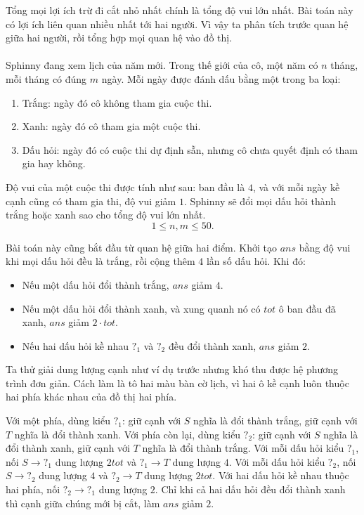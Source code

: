 \documentclass[11pt]{article}
\begin{document}
Tổng mọi lợi ích trừ đi cắt nhỏ nhất chính là tổng độ vui lớn nhất. Bài toán
này có lợi ích liên quan nhiều nhất tới hai người. Vì vậy ta phân tích trước
quan hệ giữa hai người, rồi tổng hợp mọi quan hệ vào đồ thị.

\paragraph{}
Sphinny đang xem lịch của năm mới. Trong thế giới của cô, một năm có \(n\)
tháng, mỗi tháng có đúng \(m\) ngày. Mỗi ngày được đánh dấu bằng một trong ba
loại:
\begin{enumerate}
  \item Trắng: ngày đó cô không tham gia cuộc thi.
  \item Xanh: ngày đó cô tham gia một cuộc thi.
  \item Dấu hỏi: ngày đó có cuộc thi dự định sẵn, nhưng cô chưa quyết định có
  tham gia hay không.
\end{enumerate}

Độ vui của một cuộc thi được tính như sau: ban đầu là \(4\), và với mỗi ngày
kề cạnh cũng có tham gia thi, độ vui giảm \(1\). Sphinny sẽ đổi mọi dấu hỏi
thành trắng hoặc xanh sao cho tổng độ vui lớn nhất.
\[
  1\le n,m\le 50.
\]

Bài toán này cũng bắt đầu từ quan hệ giữa hai điểm. Khởi tạo \(ans\) bằng độ
vui khi mọi dấu hỏi đều là trắng, rồi cộng thêm \(4\) lần số dấu hỏi. Khi đó:
\begin{itemize}
  \item Nếu một dấu hỏi đổi thành trắng, \(ans\) giảm \(4\).
  \item Nếu một dấu hỏi đổi thành xanh, và xung quanh nó có \(tot\) ô ban đầu
  đã xanh, \(ans\) giảm \(2\cdot tot\).
  \item Nếu hai dấu hỏi kề nhau \(?_{1}\) và \(?_{2}\) đều đổi thành xanh,
  \(ans\) giảm \(2\).
\end{itemize}

Ta thử giải dung lượng cạnh như ví dụ trước nhưng khó thu được hệ phương
trình đơn giản. Cách làm là tô hai màu bàn cờ lịch, vì hai ô kề cạnh luôn
thuộc hai phía khác nhau của đồ thị hai phía.

Với một phía, dùng kiểu \(?_{1}\): giữ cạnh với \(S\) nghĩa là đổi thành trắng,
giữ cạnh với \(T\) nghĩa là đổi thành xanh. Với phía còn lại, dùng kiểu
\(?_{2}\): giữ cạnh với \(S\) nghĩa là đổi thành xanh, giữ cạnh với \(T\)
nghĩa là đổi thành trắng. Với mỗi dấu hỏi kiểu \(?_{1}\), nối \(S\to ?_{1}\)
dung lượng \(2tot\) và \(?_{1}\to T\) dung lượng \(4\). Với mỗi dấu hỏi kiểu
\(?_{2}\), nối \(S\to ?_{2}\) dung lượng \(4\) và \(?_{2}\to T\) dung lượng
\(2tot\). Với hai dấu hỏi kề nhau thuộc hai phía, nối \(?_{2}\to ?_{1}\) dung
lượng \(2\). Chỉ khi cả hai dấu hỏi đều đổi thành xanh thì cạnh giữa chúng
mới bị cắt, làm \(ans\) giảm \(2\).
\end{document}
